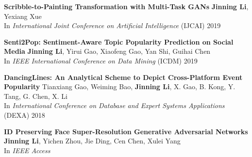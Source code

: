 \documentclass[12pt, letterpaper]{article}
\newenvironment{itemize*}%
{\begin{itemize}%
  \setlength{\itemsep}{0pt}}%
{\end{itemize}}
\newcommand{\mhead}[1]{\leavevmode\marginpar{\sffamily\footnotesize #1}}
\newcommand{\rdate}[1]{{\addfontfeature{Numbers=OldStyle} \hfill #1}}
\begin{document}

\medskip
\mhead{Publications}%
\textbf{Scribble-to-Painting Transformation with Multi-Task GANs}\href{https://www.ijcai.org/proceedings/2019/820}{}\href{https://github.com/jinningli/DSP-Net}{}\newline
\textbf{Jinning Li}, Yexiang Xue\\
In \emph{International Joint Conference on Artificial Intelligence} (IJCAI) 2019

\textbf{Senti2Pop: Sentiment-Aware Topic Popularity Prediction on Social Media}\href{http://jinningli.cn/cv/Senti2Pop.pdf}{}\newline
\textbf{Jinning Li}, Yirui Gao, Xiaofeng Gao, Yan Shi, Guihai Chen\\
In \emph{IEEE International Conference on Data Mining} (ICDM) 2019

\textbf{D\small{ancing}L\small{ines}: An Analytical Scheme to Depict Cross-Platform Event Popularity}\href{http://jinningli.cn/cv/dancinglines.pdf}{}\href{https://github.com/jinningli/dancinglines}{}\newline
Tianxiang Gao, Weiming Bao, \textbf{Jinning Li}, X. Gao, B. Kong, Y. Tang, G. Chen, X. Li\\
In \emph{International Conference on Database and Expert Systems Applications} (DEXA) 2018

\textbf{ID Preserving Face Super-Resolution Generative Adversarial Networks}\href{https://ieeexplore.ieee.org/document/9146819}{}\href{https://github.com/jinningli/IP-FSRGAN}{}\newline
\textbf{Jinning Li}, Yichen Zhou, Jie Ding, Cen Chen, Xulei Yang\\
In \emph{IEEE Access}

\end{document}
